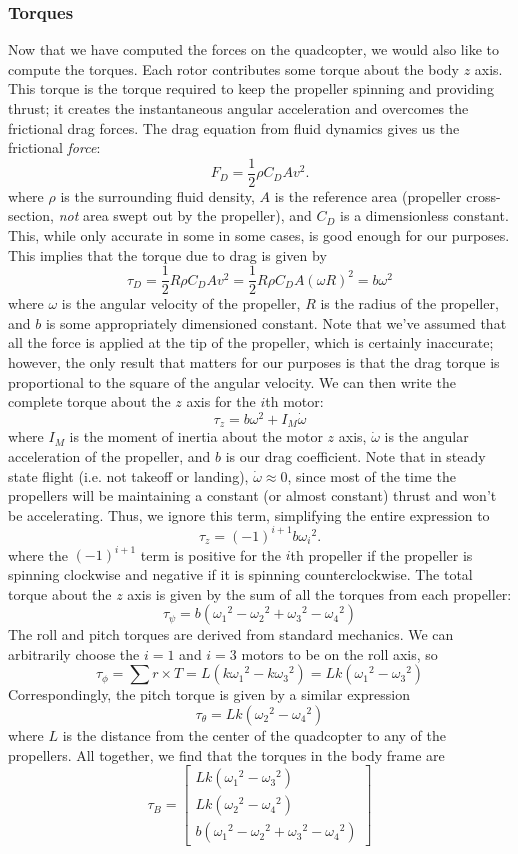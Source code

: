 \documentclass{article}
\newcommand\bmatr[1]{\begin{bmatrix} #1\end{bmatrix}}
\begin{document}
\subsubsection*{Torques}
Now that we have computed the forces on the quadcopter, we would also like to compute the torques.
Each rotor contributes some torque about the body $z$ axis. This torque is the torque required to
keep the propeller spinning and providing thrust; it creates the instantaneous angular acceleration
and overcomes the frictional drag forces. The drag equation from fluid dynamics gives us the
frictional \emph{force}:
\[F_D = \frac{1}{2}\rho C_D A v^2.\]
where $\rho$ is the surrounding fluid density, $A$ is the reference area (propeller cross-section,
\emph{not} area swept out by the propeller),
and $C_D$ is a dimensionless constant. This, while only accurate in some in some cases, is good
enough for our purposes. This implies that the torque due to drag is given by
\[\tau_D = \frac{1}{2}R \rho C_D A v^2 = \frac{1}{2}R \rho C_D A (\omega R)^2 = b\omega^2\]
where $\omega$ is the angular velocity of the propeller, $R$ is the radius of the propeller, and $b$
is some appropriately dimensioned constant. Note
that we've assumed that all the force is applied at the tip of the propeller, which is certainly
inaccurate; however, the only result that matters for our purposes is that the drag torque is proportional to the
square of the angular velocity. We can then write the complete torque about the $z$ axis for the
$i$th motor:
\[\tau_z = b\omega^2 + I_M \dot\omega\]
where $I_M$ is the moment of inertia about the motor $z$ axis, $\dot\omega$ is the angular
acceleration of the propeller, and $b$ is our drag coefficient. Note that in steady state flight
(i.e. not takeoff or landing), $\dot\omega \approx 0$, since most of the time the propellers will be
maintaining a constant (or almost constant) thrust and won't be accelerating. Thus, we ignore this
term, simplifying the entire expression to
\[\tau_z = (-1)^{i+1} b{\omega_i}^2.\]
where the $(-1)^{i+1}$ term is positive for the $i$th propeller if the propeller is spinning clockwise
and negative if it is spinning counterclockwise. The total torque about the $z$ axis is given by the
sum of all the torques from each propeller:
\[\tau_\psi = b\left( {\omega_1}^2 -  {\omega_2}^2 +  {\omega_3}^2 -  {\omega_4}^2\right)\]
The roll and pitch torques are derived from standard mechanics. We can arbitrarily choose the $i =
1$ and $i=3$ motors to be on the roll axis, so
\[\tau_\phi = \sum r\times T = L(k{\omega_1}^2 - k{\omega_3}^2) = Lk({\omega_1}^2 - {\omega_3}^2)\]
Correspondingly, the pitch torque is given by a similar expression
\[\tau_\theta = Lk({\omega_2}^2 - {\omega_4}^2)\]
where $L$ is the distance from the center of the quadcopter to any of the propellers. All together,
we find that the torques in the body frame are
\[\tau_B = \bmatr{
    Lk({\omega_1}^2 - {\omega_3}^2) \\
    Lk({\omega_2}^2 - {\omega_4}^2) \\
    b\left( {\omega_1}^2 -  {\omega_2}^2 +  {\omega_3}^2 -  {\omega_4}^2\right)
}\]
\end{document}
